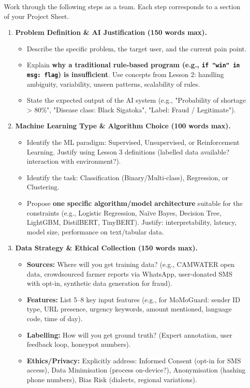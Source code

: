 \documentclass[11pt]{article}
\newcommand{\cle}[1]{{\popxbold\color{popdark}#1}}
\newcounter{popsec}
\newcounter{popsub}
\newcommand{\courssub}[1]{%
  \stepcounter{popsub}%
  \par\vspace{9pt}\noindent{\popxbold\fontsize{11.5}{13}\selectfont\color{popink}{\color{poporange}\thepopsec.\thepopsub}\hspace{6pt}#1}\par\nopagebreak\vspace{4pt}
}
\begin{document}
\courssub{Tasks}
Work through the following steps as a team. Each step corresponds to a section of your Project Sheet.

\begin{enumerate}
    \item \textbf{Problem Definition \& AI Justification (150 words max).}
    \begin{itemize}
        \item Describe the specific problem, the target user, and the current pain point.
        \item Explain \textbf{why a traditional rule-based program (e.g., \texttt{if "win" in msg: flag}) is insufficient}. Use concepts from Lesson 2: handling ambiguity, variability, unseen patterns, scalability of rules.
        \item State the expected output of the AI system (e.g., "Probability of shortage > 80\%", "Disease class: Black Sigatoka", "Label: Fraud / Legitimate").
    \end{itemize}

    \item \textbf{Machine Learning Type \& Algorithm Choice (100 words max).}
    \begin{itemize}
        \item Identify the ML paradigm: \cle{Supervised}, \cle{Unsupervised}, or \cle{Reinforcement Learning}. Justify using Lesson 3 definitions (labelled data available? interaction with environment?).
        \item Identify the task: \cle{Classification} (Binary/Multi-class), \cle{Regression}, or \cle{Clustering}.
        \item Propose \textbf{one specific algorithm/model architecture} suitable for the constraints (e.g., Logistic Regression, Naïve Bayes, Decision Tree, LightGBM, DistilBERT, TinyBERT). Justify: interpretability, latency, model size, performance on text/tabular data.
    \end{itemize}

    \item \textbf{Data Strategy \& Ethical Collection (150 words max).}
    \begin{itemize}
        \item \textbf{Sources:} Where will you get training data? (e.g., CAMWATER open data, crowdsourced farmer reports via WhatsApp, user-donated SMS with opt-in, synthetic data generation for fraud).
        \item \textbf{Features:} List 5--8 key input features (e.g., for MoMoGuard: sender ID type, URL presence, urgency keywords, amount mentioned, language code, time of day).
        \item \textbf{Labelling:} How will you get ground truth? (Expert annotation, user feedback loop, honeypot numbers).
        \item \textbf{Ethics/Privacy:} Explicitly address: \cle{Informed Consent} (opt-in for SMS access), \cle{Data Minimisation} (process on-device?), \cle{Anonymisation} (hashing phone numbers), \cle{Bias Risk} (dialects, regional variations).
    \end{itemize}


\end{enumerate}
\end{document}
